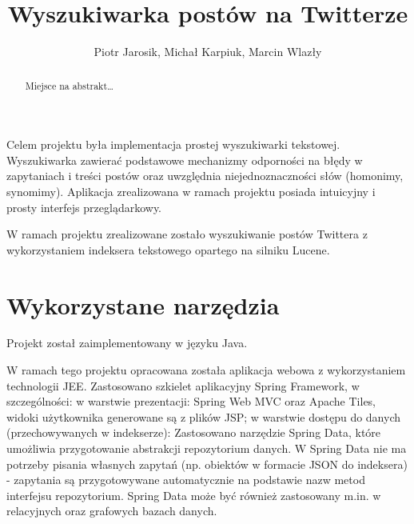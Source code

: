 \documentclass[runningheads]{llncs}
\begin{document}
 
\pagestyle{headings} \addtocmark{}
% 
\title{Wyszukiwarka postów na Twitterze}
% 
% 
\author{Piotr Jarosik, Michał Karpiuk, Marcin Wlazły}
% 
% 
\maketitle
\begin{abstract}
Miejsce na abstrakt\ldots
{}
\end{abstract}

Celem projektu była implementacja prostej wyszukiwarki tekstowej. Wyszukiwarka
zawierać podstawowe mechanizmy odporności na błędy w zapytaniach i treści postów
oraz uwzględnia niejednoznaczności słów (homonimy, synomimy). 
Aplikacja zrealizowana w ramach projektu posiada intuicyjny
i prosty interfejs przeglądarkowy.

W ramach projektu zrealizowane zostało wyszukiwanie postów Twittera 
z wykorzystaniem indeksera tekstowego opartego na silniku Lucene.

\section{Wykorzystane narzędzia}
\label{sec:wykorzystane-narzedzia}

Projekt został zaimplementowany w języku Java.

W ramach tego projektu opracowana została aplikacja webowa z wykorzystaniem 
technologii JEE. Zastosowano szkielet aplikacyjny Spring Framework, w
szczególności:
w warstwie prezentacji: 
Spring Web MVC oraz Apache Tiles, widoki użytkownika generowane są z plików JSP;
w warstwie dostępu do danych (przechowywanych w indekserze):
Zastosowano narzędzie Spring Data, które umożliwia przygotowanie abstrakcji 
repozytorium danych. W Spring Data  nie ma potrzeby pisania własnych zapytań
(np. obiektów w formacie JSON do indeksera) - zapytania  są przygotowywane
automatycznie na podstawie nazw metod interfejsu repozytorium.  Spring Data może
być również zastosowany m.in. w relacyjnych oraz grafowych bazach danych.
\end{document}
